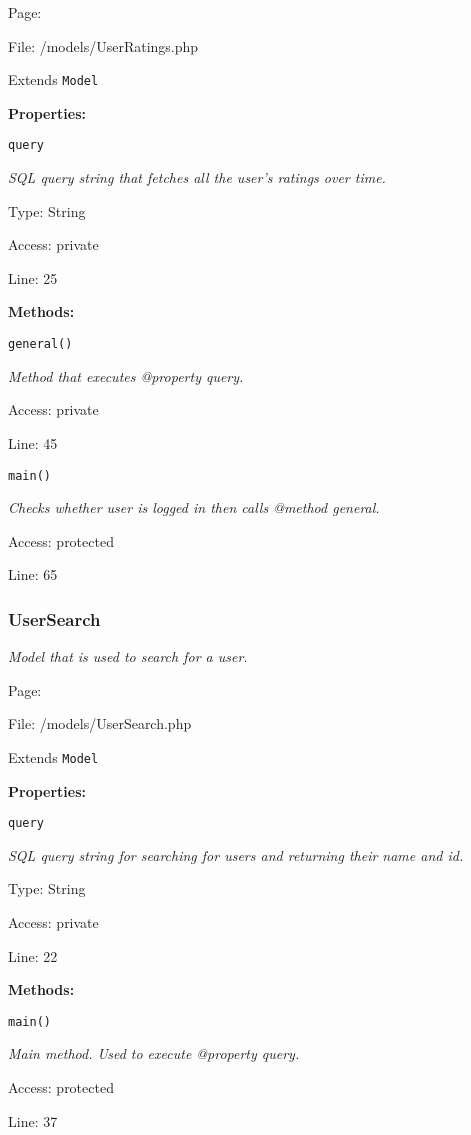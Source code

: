 Page: \pageref{UserRatings.php}

File: /models/UserRatings.php

Extends \texttt{Model}

\textbf{Properties:}

\texttt{query}

{\scriptsize
\textit{SQL query string that fetches all the user's ratings over time.}

Type: String

Access: private

Line: 25

}
\textbf{Methods:}

\texttt{general()}

{\scriptsize
\textit{Method that executes @property query.}

Access: private

Line: 45

}

\texttt{main()}

{\scriptsize
\textit{Checks whether user is logged in then calls @method general.}

Access: protected

Line: 65

}

\subsubsection{UserSearch}\label{UserSearch.php.doc}
\textit{Model that is used to search for a user.}

Page: \pageref{UserSearch.php}

File: /models/UserSearch.php

Extends \texttt{Model}

\textbf{Properties:}

\texttt{query}

{\scriptsize
\textit{SQL query string for searching for users and returning their name and id.}

Type: String

Access: private

Line: 22

}
\textbf{Methods:}

\texttt{main()}

{\scriptsize
\textit{Main method.
Used to execute @property query.}

Access: protected

Line: 37

}

